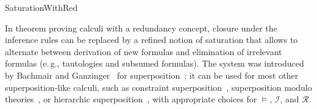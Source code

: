 \begin{entry}{SaturationWithRed}
\begin{history}
In theorem proving calculi with a redundancy concept,
closure under the inference rules can be replaced by
a refined notion of saturation that allows to
alternate between derivation of new formulas and
elimination of irrelevant formulas
(e.\,g., tautologies and subsumed formulas).
The system was introduced by
Bachmair and Gan\-zin\-ger~\cite{BachmairGanzinger1990CTRS}
for superposition~;
it can be used for most other super\-posi\-tion-like calculi,
such as constraint superposition~,
superposition modulo theories~, or
hierarchic superposition~, with appropriate choices for
$\models$, $\mathcal{I}$, and $\mathcal{R}$.
\end{history}




%
%
%
%
%
%
% 
%












\end{entry}
